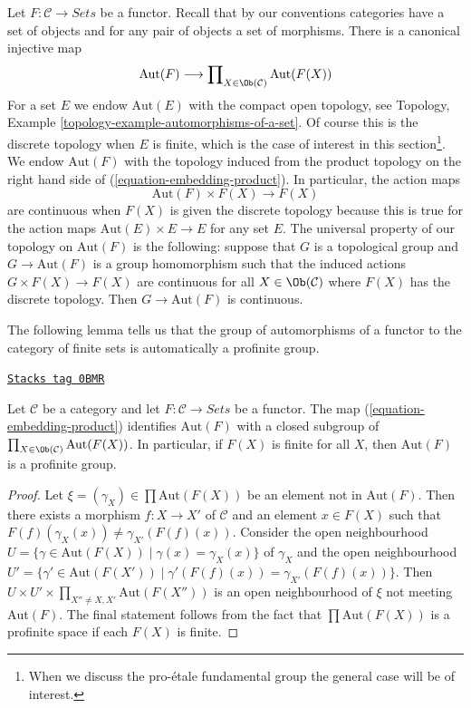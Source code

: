 \medskip\noindent
Let $F : \mathcal{C} \to \textit{Sets}$ be a functor.
Recall that by our conventions categories have a set of objects and
for any pair of objects a set of morphisms. There is a canonical
injective map
\begin{equation}
\label{equation-embedding-product}
\text{Aut}(F)
\longrightarrow
\prod\nolimits_{X \in \Ob(\mathcal{C})} \text{Aut}(F(X))
\end{equation}
For a set $E$ we endow $\text{Aut}(E)$ with the compact open topology, see
Topology, Example \ref{topology-example-automorphisms-of-a-set}.
Of course this is the discrete topology when $E$ is finite, which
is the case of interest in this section\footnote{When we discuss the
pro-\'etale fundamental group the general case will be of interest.}.
We endow $\text{Aut}(F)$ with the topology induced from the
product topology on the right hand side of (\ref{equation-embedding-product}).
In particular, the action maps
$$
\text{Aut}(F) \times F(X) \longrightarrow F(X)
$$
are continuous when $F(X)$ is given the discrete topology because this
is true for the action maps $\text{Aut}(E) \times E \to E$ for any set $E$.
The universal property of our topology on $\text{Aut}(F)$ is the following:
suppose that $G$ is a topological group and $G \to \text{Aut}(F)$
is a group homomorphism such that the induced actions $G \times F(X) \to F(X)$
are continuous for all $X \in \Ob(\mathcal{C})$ where $F(X)$ has
the discrete topology. Then $G \to \text{Aut}(F)$ is continuous.

\medskip\noindent
The following lemma tells us that the group of automorphisms of a functor
to the category of finite sets is automatically a profinite group.

\begin{lemma}
\label{pione-lemma-aut-inverse-limit}
\href{https://stacks.math.columbia.edu/tag/0BMR}{\texttt{Stacks tag 0BMR}}

Let $\mathcal{C}$ be a category and let $F : \mathcal{C} \to \textit{Sets}$
be a functor. The map (\ref{equation-embedding-product}) identifies
$\text{Aut}(F)$ with a closed subgroup of
$\prod_{X \in \Ob(\mathcal{C})} \text{Aut}(F(X))$.
In particular, if $F(X)$ is finite for all $X$, then
$\text{Aut}(F)$ is a profinite group.
\end{lemma}

\begin{proof}
Let $\xi = (\gamma_X) \in \prod \text{Aut}(F(X))$ be an element not in
$\text{Aut}(F)$. Then there exists a morphism $f : X \to X'$ of $\mathcal{C}$
and an element $x \in F(X)$ such that
$F(f)(\gamma_X(x)) \not = \gamma_{X'}(F(f)(x))$.
Consider the open neighbourhood
$U = \{\gamma \in \text{Aut}(F(X)) \mid \gamma(x) = \gamma_X(x)\}$
of $\gamma_X$ and the open neighbourhood
$U' = \{\gamma' \in \text{Aut}(F(X')) \mid \gamma'(F(f)(x)) =
\gamma_{X'}(F(f)(x))\}$.
Then
$U \times U' \times \prod_{X'' \not = X, X'} \text{Aut}(F(X''))$
is an open neighbourhood of $\xi$ not meeting $\text{Aut}(F)$.
The final statement follows from the fact that
$\prod \text{Aut}(F(X))$ is a profinite space if each $F(X)$ is finite.
\end{proof}

